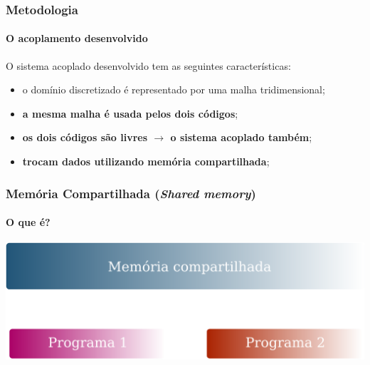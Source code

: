 \documentclass[svgnames,smaller,table]{beamer}
\begin{document}
\begin{frame}
  \frametitle{Metodologia}
  \framesubtitle{O acoplamento desenvolvido}
  O sistema acoplado desenvolvido tem as seguintes características:
  \\
  \vspace{0.2cm}
  \begin{itemize}
  \item o domínio discretizado é representado por uma malha tridimensional;
  \item \textbf{a mesma malha é usada pelos dois códigos};
  \item \textbf{os dois códigos são livres $\rightarrow$ o sistema acoplado também};
  \item \textbf{trocam dados utilizando memória compartilhada};
  \end{itemize}
  
\end{frame}

{
\begin{frame}
  \frametitle{Memória Compartilhada (\textit{Shared memory})}
  \framesubtitle{O que é?}
  \centering\includegraphics[scale=0.9]{../figuras/shm-neg.png}
\end{frame}
}
\end{document}
